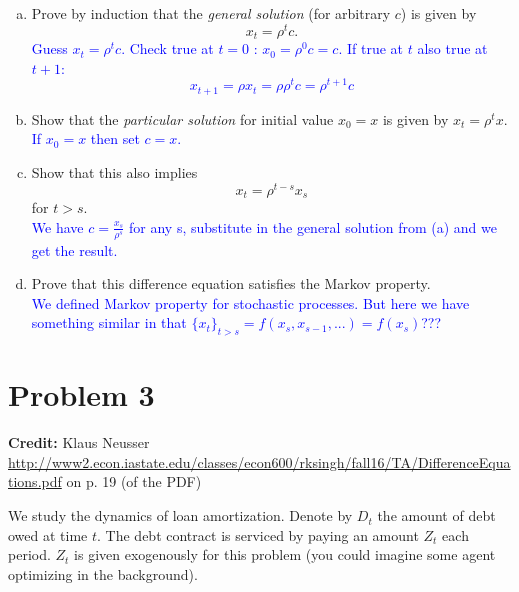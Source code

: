 \documentclass[11pt]{extarticle}
\theoremstyle{plain}
\theoremstyle{definition}
\begin{document}
\begin{enumerate}[(a)]
\item Prove by induction that the \textit{general solution} (for arbitrary $c$) is given by
\begin{equation*}
	x_t = \rho^t c.
\end{equation*}
\textcolor{blue}{Guess $x_t=\rho^t c$. Check true at $t= 0$ : $x_0 = \rho^0c=c$. If true at $t$ also true at $t+1$: $$x_{t+1}=\rho x_t = \rho \rho^t c= \rho^{t+1}c$$}

\item Show that the \textit{particular solution} for initial value $x_0 = x$ is given by $x_t = \rho^t x$. 
\textcolor{blue}{If $x_0=x$ then set $c=x$.}

\item Show that this also implies 
\begin{equation*}
	x_t = \rho^{t-s} x_s
\end{equation*}
for $t > s$. \\
\textcolor{blue}{We have $c=\frac{x_s}{\rho^s}$ for any s, substitute in the general solution from (a) and we get the result.}

\item Prove that this difference equation satisfies the Markov property. \\
\textcolor{blue}{We defined Markov property for stochastic processes.  But here we have something similar in that $\{x_t\}_{t>s}=f(x_s,x_{s-1},...)=f(x_s)$???}
\end{enumerate}



\vspace{10mm}
\section*{Problem 3}

\textbf{Credit:} Klaus Neusser \url{http://www2.econ.iastate.edu/classes/econ600/rksingh/fall16/TA/DifferenceEquations.pdf} on p. 19 (of the PDF)

\vspace{5mm}
\noindent
We study the dynamics of loan amortization. Denote by $D_t$ the amount of debt owed at time $t$. The debt contract is serviced by paying an amount $Z_t$ each period. $Z_t$ is given exogenously for this problem (you could imagine some agent optimizing in the background).
\end{document}

